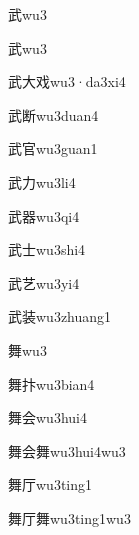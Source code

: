 \begin{verbete}[8]{武}{wu3}
\end{verbete}
\begin{verbete*}[8]{武}{wu3}
\end{verbete*}
\begin{verbete*}[8;3;6]{武大戏}{wu3·da3xi4}
\end{verbete*}
\begin{verbete}[8;11]{武断}{wu3duan4}
\end{verbete}
\begin{verbete}[8;8]{武官}{wu3guan1}
\end{verbete}
\begin{verbete}[8;2]{武力}{wu3li4}
\end{verbete}
\begin{verbete}[8;16]{武器}{wu3qi4}
\end{verbete}
\begin{verbete}[8;3]{武士}{wu3shi4}
\end{verbete}
\begin{verbete}[8;4]{武艺}{wu3yi4}
\end{verbete}
\begin{verbete}[8;12]{武装}{wu3zhuang1}
\end{verbete}
\begin{verbete}[14]{舞}{wu3}
\end{verbete}
\begin{verbete}[14;7]{舞抃}{wu3bian4}
\end{verbete}
\begin{verbete}[14;6]{舞会}{wu3hui4}
\end{verbete}
\begin{verbete}[14;6;14]{舞会舞}{wu3hui4wu3}
\end{verbete}
\begin{verbete}[14;4]{舞厅}{wu3ting1}
\end{verbete}
\begin{verbete}[14;4;14]{舞厅舞}{wu3ting1wu3}
\end{verbete}

